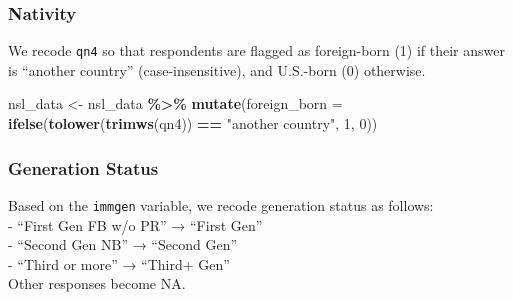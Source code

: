 \documentclass[
]{article}
\newenvironment{Shaded}{\begin{snugshade}}{\end{snugshade}}
\newcommand{\AttributeTok}[1]{\textcolor[rgb]{0.13,0.29,0.53}{#1}}
\newcommand{\ConstantTok}[1]{\textcolor[rgb]{0.56,0.35,0.01}{#1}}
\newcommand{\DecValTok}[1]{\textcolor[rgb]{0.00,0.00,0.81}{#1}}
\newcommand{\FunctionTok}[1]{\textcolor[rgb]{0.13,0.29,0.53}{\textbf{#1}}}
\newcommand{\NormalTok}[1]{#1}
\newcommand{\OtherTok}[1]{\textcolor[rgb]{0.56,0.35,0.01}{#1}}
\newcommand{\SpecialCharTok}[1]{\textcolor[rgb]{0.81,0.36,0.00}{\textbf{#1}}}
\newcommand{\StringTok}[1]{\textcolor[rgb]{0.31,0.60,0.02}{#1}}
\begin{document}
\subsubsection{Nativity}\label{nativity}

We recode \texttt{qn4} so that respondents are flagged as foreign-born
(1) if their answer is ``another country'' (case-insensitive), and
U.S.-born (0) otherwise.

\begin{Shaded}
\begin{Highlighting}[]
\NormalTok{nsl\_data }\OtherTok{\textless{}{-}}\NormalTok{ nsl\_data }\SpecialCharTok{\%\textgreater{}\%}
  \FunctionTok{mutate}\NormalTok{(}\AttributeTok{foreign\_born =} \FunctionTok{ifelse}\NormalTok{(}\FunctionTok{tolower}\NormalTok{(}\FunctionTok{trimws}\NormalTok{(qn4)) }\SpecialCharTok{==} \StringTok{"another country"}\NormalTok{, }\DecValTok{1}\NormalTok{, }\DecValTok{0}\NormalTok{))}
\end{Highlighting}
\end{Shaded}

\subsubsection{Generation Status}\label{generation-status}

Based on the \texttt{immgen} variable, we recode generation status as
follows:\\
- ``First Gen FB w/o PR'' → ``First Gen''\\
- ``Second Gen NB'' → ``Second Gen''\\
- ``Third or more'' → ``Third+ Gen''\\
Other responses become NA.

\begin{Shaded}
\end{Shaded}
\end{document}
